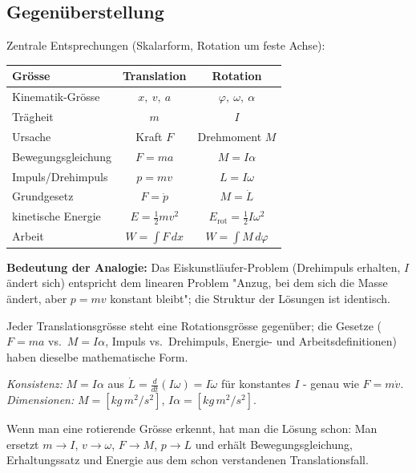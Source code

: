 
\subsection*{Gegenüberstellung}
Zentrale Entsprechungen (Skalarform, Rotation um feste Achse):

\begin{center}
\renewcommand{\arraystretch}{1.35}
\begin{tabular}{lcc}
\toprule
\textbf{Grösse} & \textbf{Translation} & \textbf{Rotation}\\
\midrule
Kinematik-Grösse & $x,\ v,\ a$ & $\varphi,\ \omega,\ \alpha$\\
Trägheit & $m$ & $I$\\
Ursache & Kraft $F$ & Drehmoment $M$\\
Bewegungsgleichung & $F=ma$ & $M=I\alpha$\\
Impuls/Drehimpuls & $p=mv$ & $L=I\omega$\\
Grundgesetz & $F=\dot p$ & $M=\dot L$\\
kinetische Energie & $E=\frac12 m v^2$ & $E_\mathrm{rot}=\frac12 I\omega^2$\\
Arbeit & $W=\int F\,dx$ & $W=\int M\,d\varphi$\\
\bottomrule
\end{tabular}
\end{center}

\textbf{Bedeutung der Analogie:} Das Eiskunstläufer-Problem (Drehimpuls
erhalten, $I$ ändert sich) entspricht dem linearen Problem "Anzug, bei dem
sich die Masse ändert, aber $p=mv$ konstant bleibt"; die Struktur der
Lösungen ist identisch.

\begin{ergebnis}
Jeder Translationsgrösse steht eine Rotationsgrösse gegenüber; die
Gesetze ($F=ma$ vs.\ $M=I\alpha$, Impuls vs.\ Drehimpuls, Energie- und
Arbeitsdefinitionen) haben dieselbe mathematische Form.
\end{ergebnis}

\begin{kontrolle}
\emph{Konsistenz:} $M=I\alpha$ aus $\dot L=\frac{d}{dt}(I\omega)=I\dot\omega$
für konstantes $I$ - genau wie $F=m\dot v$. \checkmark
\emph{Dimensionen:} $M=[kg\,m^2/s^2]$, $I\alpha=[kg\,m^2/s^2]$. \checkmark
\end{kontrolle}

\begin{merksatz}
Wenn man eine rotierende Grösse erkennt, hat man die Lösung schon: Man
ersetzt $m\to I$, $v\to\omega$, $F\to M$, $p\to L$ und erhält
Bewegungsgleichung, Erhaltungssatz und Energie aus dem schon verstandenen
Translationsfall.
\end{merksatz}